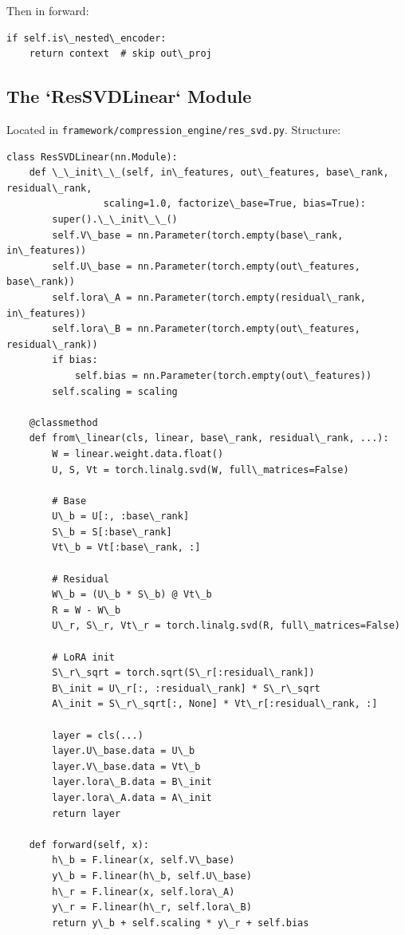 Then in forward:
\begin{lstlisting}
if self.is\_nested\_encoder:
    return context  # skip out\_proj
\end{lstlisting}

\subsection{The `ResSVDLinear` Module}

Located in \texttt{framework/compression\_engine/res\_svd.py}. Structure:

\begin{lstlisting}
class ResSVDLinear(nn.Module):
    def \_\_init\_\_(self, in\_features, out\_features, base\_rank, residual\_rank,
                 scaling=1.0, factorize\_base=True, bias=True):
        super().\_\_init\_\_()
        self.V\_base = nn.Parameter(torch.empty(base\_rank, in\_features))
        self.U\_base = nn.Parameter(torch.empty(out\_features, base\_rank))
        self.lora\_A = nn.Parameter(torch.empty(residual\_rank, in\_features))
        self.lora\_B = nn.Parameter(torch.empty(out\_features, residual\_rank))
        if bias:
            self.bias = nn.Parameter(torch.empty(out\_features))
        self.scaling = scaling
    
    @classmethod
    def from\_linear(cls, linear, base\_rank, residual\_rank, ...):
        W = linear.weight.data.float()
        U, S, Vt = torch.linalg.svd(W, full\_matrices=False)
        
        # Base
        U\_b = U[:, :base\_rank]
        S\_b = S[:base\_rank]
        Vt\_b = Vt[:base\_rank, :]
        
        # Residual
        W\_b = (U\_b * S\_b) @ Vt\_b
        R = W - W\_b
        U\_r, S\_r, Vt\_r = torch.linalg.svd(R, full\_matrices=False)
        
        # LoRA init
        S\_r\_sqrt = torch.sqrt(S\_r[:residual\_rank])
        B\_init = U\_r[:, :residual\_rank] * S\_r\_sqrt
        A\_init = S\_r\_sqrt[:, None] * Vt\_r[:residual\_rank, :]
        
        layer = cls(...)
        layer.U\_base.data = U\_b
        layer.V\_base.data = Vt\_b
        layer.lora\_B.data = B\_init
        layer.lora\_A.data = A\_init
        return layer
    
    def forward(self, x):
        h\_b = F.linear(x, self.V\_base)
        y\_b = F.linear(h\_b, self.U\_base)
        h\_r = F.linear(x, self.lora\_A)
        y\_r = F.linear(h\_r, self.lora\_B)
        return y\_b + self.scaling * y\_r + self.bias
\end{lstlisting}

